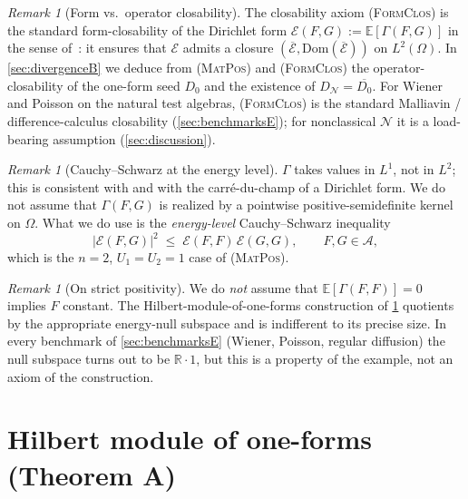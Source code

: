 \documentclass[11pt,reqno]{amsart}
\theoremstyle{plain}
\theoremstyle{definition}
\theoremstyle{remark}
\newtheorem{remark}[theorem]{Remark}
\newcommand{\R}{\mathbb{R}}
\newcommand{\E}{\mathbb{E}}
\newcommand{\Dom}{\mathrm{Dom}}
\newcommand{\cA}{\mathcal A}
\newcommand{\cE}{\mathcal E}
\newcommand{\cN}{\mathcal N}
\newcommand{\dN}{D_{\cN}}
\begin{document}
\begin{remark}[Form vs.\ operator closability]\label{rem:formclos}
The closability axiom \textsc{(FormClos)} is the standard
form-closability of the Dirichlet form $\cE(F,G):=\E[\Gamma(F,G)]$
in the sense of~\cite[Ch.~1]{FukushimaOshimaTakeda}: it ensures
that $\cE$ admits a closure
$(\overline{\cE},\Dom(\overline{\cE}))$ on $L^{2}(\Omega)$. In
\cref{sec:divergenceB} we deduce from \textsc{(MatPos)} and
\textsc{(FormClos)} the operator-closability of the
one-form seed $D_{0}$ and the existence of $\dN=\overline{D_{0}}$.
For Wiener and Poisson on the natural test algebras,
\textsc{(FormClos)} is the standard Malliavin / difference-calculus
closability (\cref{sec:benchmarksE}); for nonclassical $\cN$ it
is a load-bearing assumption (\cref{sec:discussion}).
\end{remark}

\begin{remark}[Cauchy--Schwarz at the energy level]\label{rem:CS-energy}
$\Gamma$ takes values in $L^{1}$, not in $L^{2}$; this is
consistent with \cite[\S 6]{PrimitiveDivergence} and with the
carr\'e-du-champ of a Dirichlet form. We do not assume that
$\Gamma(F,G)$ is realized by a pointwise positive-semidefinite
kernel on $\Omega$. What we do use is the \emph{energy-level}
Cauchy--Schwarz inequality
\begin{equation}\label{eq:CS-energy}
  |\cE(F,G)|^{2}\;\le\;\cE(F,F)\,\cE(G,G),\qquad F,G\in\cA,
\end{equation}
which is the $n=2$, $U_{1}=U_{2}=1$ case of \textsc{(MatPos)}.
\end{remark}

\begin{remark}[On strict positivity]\label{rem:strict-positivity}
We do \emph{not} assume that $\E[\Gamma(F,F)]=0$ implies $F$
constant. The Hilbert-module-of-one-forms construction of
\cref{sec:moduleA} quotients by the appropriate energy-null
subspace and is indifferent to its precise size. In every
benchmark of \cref{sec:benchmarksE} (Wiener, Poisson, regular
diffusion) the null subspace turns out to be $\R\cdot 1$, but
this is a property of the example, not an axiom of the
construction.
\end{remark}

\section{Hilbert module of one-forms (Theorem A)}\label{sec:moduleA}
\end{document}
